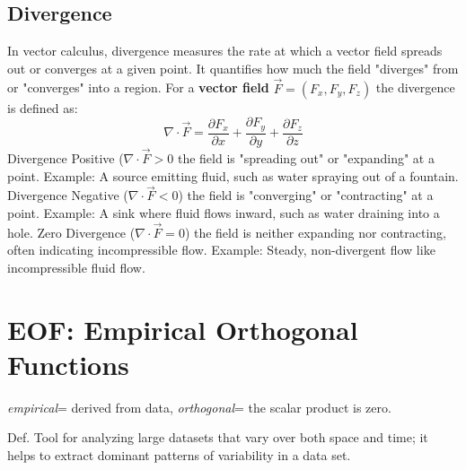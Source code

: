 \subsection{Divergence}
In vector calculus, divergence measures the rate at which a vector field spreads out or converges at a given point. It quantifies how much the field "diverges" from or "converges" into a region. For a \textbf{vector field} $\vec{F}=(F_x,F_y,F_z)$ the divergence is defined as:
$$\nabla\cdot \vec{F}=\frac{\partial F_x}{\partial x}+\frac{\partial F_y}{\partial y}+\frac{\partial F_z}{\partial z}$$
Divergence Positive ($\nabla\cdot \vec{F}>0$ the field is "spreading out" or "expanding" at a point.
Example: A source emitting fluid, such as water spraying out of a fountain.
Divergence Negative ($\nabla\cdot \vec{F}<0$) the field is "converging" or "contracting" at a point.
Example: A sink where fluid flows inward, such as water draining into a hole.
Zero Divergence ($\nabla\cdot \vec{F}=0$) the field is neither expanding nor contracting, often indicating incompressible flow.
Example: Steady, non-divergent flow like incompressible fluid flow.

\section{EOF: Empirical Orthogonal Functions}
\textit{empirical}= derived from data, \textit{orthogonal}= the scalar product is zero.


\textcolor{NavyBlue}{Def.} Tool for analyzing large datasets that vary over both space and time; it helps to extract dominant patterns of variability in a data set. 
